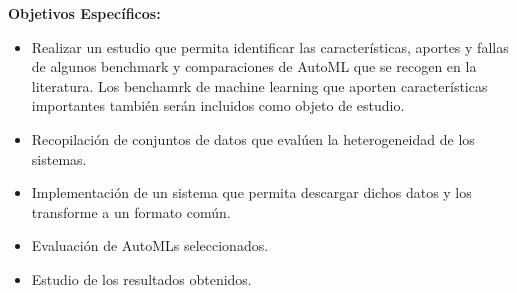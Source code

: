 \begin{flushleft} 
\textbf{Objetivos Específicos:}
\begin{itemize}
    \item Realizar un estudio que permita identificar las características, aportes y fallas de algunos benchmark y comparaciones de AutoML que se recogen en la 
    literatura. 
    Los benchamrk de machine learning que aporten características importantes también serán incluidos como objeto de estudio.
    \item Recopilación de conjuntos de datos que evalúen la heterogeneidad de los sistemas.
    \item Implementación de un sistema que permita descargar dichos datos y los transforme a un formato común.  
    \item Evaluación de AutoMLs seleccionados.
    \item Estudio de los resultados obtenidos.
\end{itemize}
\end{flushleft} 
